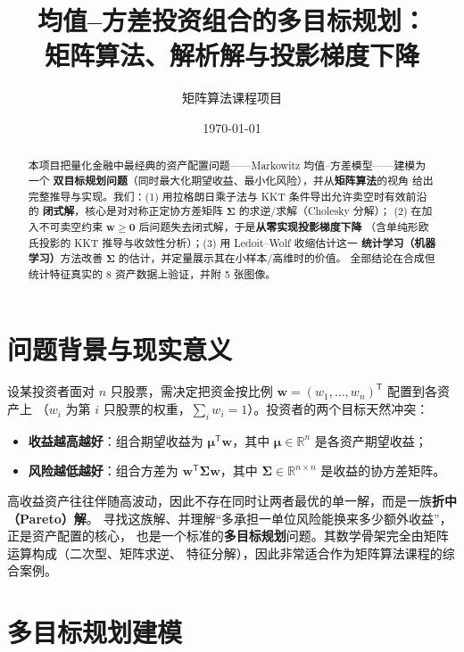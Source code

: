 \documentclass[12pt]{ctexart}
\title{\textbf{均值--方差投资组合的多目标规划：\\矩阵算法、解析解与投影梯度下降}}
\author{矩阵算法课程项目}
\date{\today}
\newcommand{\R}{\mathbb{R}}
\newcommand{\w}{\bm{w}}
\newcommand{\muv}{\bm{\mu}}
\newcommand{\Sig}{\bm{\Sigma}}
\newcommand{\T}{^{\mathsf{T}}}
\theoremstyle{definition}
\theoremstyle{plain}
\begin{document}
\maketitle

\begin{abstract}
本项目把量化金融中最经典的资产配置问题——Markowitz 均值--方差模型——建模为一个
\textbf{双目标规划问题}（同时最大化期望收益、最小化风险），并从\textbf{矩阵算法}的视角
给出完整推导与实现。我们：(1) 用拉格朗日乘子法与 KKT 条件导出允许卖空时有效前沿的
\textbf{闭式解}，核心是对对称正定协方差矩阵 $\Sig$ 的求逆/求解（Cholesky 分解）；
(2) 在加入不可卖空约束 $\w\ge\bm 0$ 后问题失去闭式解，于是\textbf{从零实现投影梯度下降}
（含单纯形欧氏投影的 KKT 推导与收敛性分析）；(3) 用 Ledoit--Wolf 收缩估计这一
\textbf{统计学习（机器学习）}方法改善 $\Sig$ 的估计，并定量展示其在小样本/高维时的价值。
全部结论在合成但统计特征真实的 8 资产数据上验证，并附 5 张图像。
\end{abstract}

\tableofcontents

\section{问题背景与现实意义}

设某投资者面对 $n$ 只股票，需决定把资金按比例 $\w=(w_1,\dots,w_n)\T$ 配置到各资产上
（$w_i$ 为第 $i$ 只股票的权重，$\sum_i w_i=1$）。投资者的两个目标天然冲突：

\begin{itemize}[nosep]
  \item \textbf{收益越高越好}：组合期望收益为 $\muv\T\w$，其中 $\muv\in\R^n$ 是各资产期望收益；
  \item \textbf{风险越低越好}：组合方差为 $\w\T\Sig\w$，其中 $\Sig\in\R^{n\times n}$ 是收益的协方差矩阵。
\end{itemize}

高收益资产往往伴随高波动，因此不存在同时让两者最优的单一解，而是一族\textbf{折中（Pareto）解}。
寻找这族解、并理解“多承担一单位风险能换来多少额外收益”，正是资产配置的核心，
也是一个标准的\textbf{多目标规划}问题。其数学骨架完全由矩阵运算构成（二次型、矩阵求逆、
特征分解），因此非常适合作为矩阵算法课程的综合案例。

\section{多目标规划建模}
\end{document}

